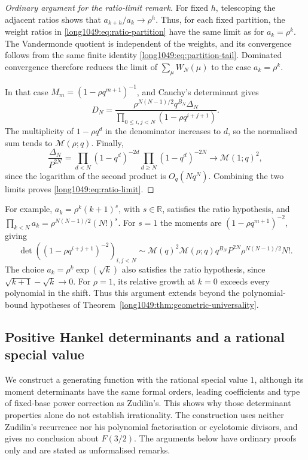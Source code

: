\begin{proof}[Ordinary argument for the ratio-limit remark]
For fixed $h$, telescoping the adjacent ratios shows that
$a_{k+h}/a_k\to \rho^h$. Thus, for each fixed partition, the weight
ratios in \eqref{long1049:eq:ratio-partition} have the same limit as for
$a_k=\rho^k$. The Vandermonde quotient is independent of the
weights, and its convergence follows from the same finite identity
\eqref{long1049:eq:partition-tail}. Dominated convergence
therefore reduces the limit of $\sum_\mu W_N(\mu)$ to the case
$a_k=\rho^k$.

In that case $M_m=(1-\rho q^{m+1})^{-1}$, and Cauchy's determinant gives
\[
 D_N=\frac{\rho^{N(N-1)/2}q^{B_N}\Delta_N}
 {\prod_{0\le i,j<N}(1-\rho q^{i+j+1})}.
\]
The multiplicity of $1-\rho q^d$ in the denominator increases to $d$,
so the normalised sum tends to $\mathcal M(\rho;q)$. Finally,
\[
 \frac{\Delta_N}{P^{2N}}
 =\prod_{d<N}(1-q^d)^{-2d}\prod_{d\ge N}(1-q^d)^{-2N}
 \longrightarrow\mathcal M(1;q)^2,
\]
since the logarithm of the second product is $O_q(Nq^N)$.
Combining the two limits proves \eqref{long1049:eq:ratio-limit}.
\end{proof}

For example, $a_k=\rho^k(k+1)^s$, with $s\in\mathbb R$, satisfies
the ratio hypothesis, and
$\prod_{k<N}a_k=\rho^{N(N-1)/2}(N!)^s$.
For $s=1$ the moments are $(1-\rho q^{m+1})^{-2}$, giving
\[
 \det\left((1-\rho q^{i+j+1})^{-2}\right)_{i,j<N}
 \sim\mathcal M(q)^2\mathcal M(\rho;q)
       q^{B_N}P^{2N}\rho^{N(N-1)/2}N!.
\]
The choice $a_k=\rho^k\exp(\sqrt{k})$ also satisfies the ratio
hypothesis, since $\sqrt{k+1}-\sqrt{k}\to0$.
For $\rho=1$, its relative growth at $k=0$ exceeds every polynomial in the shift.
Thus this argument extends beyond the polynomial-bound hypotheses of
Theorem~\ref{long1049:thm:geometric-universality}.



\subsection{Positive Hankel determinants and a rational special value}
\label{long1049:sec:calibrated-countermodel}

We construct a generating function with the rational special value
$1$, although its moment determinants have the same formal orders,
leading coefficients and type of fixed-base power correction as
Zudilin's. This shows why those determinant properties alone do not
establish irrationality. The construction uses neither Zudilin's
recurrence nor his polynomial factorisation or cyclotomic divisors,
and gives no conclusion about $F(3/2)$. The arguments below have
ordinary proofs only and are stated as unformalised remarks.

